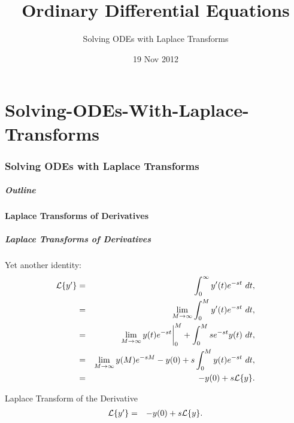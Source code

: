 \part{Solving-ODEs-With-Laplace-Transforms}
\section{Solving ODEs with Laplace Transforms}

\title{Ordinary Differential Equations}
\subtitle{Solving ODEs with Laplace Transforms}
\date{19 Nov 2012}

\begin{frame}
  \titlepage
\end{frame}

\begin{frame}
  \frametitle{Outline}
  \tableofcontents[ currentsection ]
\end{frame}


\subsection{Laplace Transforms of Derivatives}


\begin{frame}
  \frametitle{Laplace Transforms of Derivatives}

  Yet another identity:
  \begin{eqnarray*}
    \laplace{y'} & = & \int^\infty_0 y'(t) e^{-st} ~ dt, \\
    & = & \lim_{M\rightarrow\infty} \int^M_0 y'(t) e^{-st} ~ dt, \\
    & = & \lim_{M\rightarrow\infty} y(t)e^{-st} \bigg|^M_0 + \int^M_0 s e^{-st} y(t)~dt, \\
    & = & \lim_{M\rightarrow\infty} y(M)e^{-sM} - y(0) + s \int^M_0 y(t) e^{-st} ~dt, \\
    & = & -y(0) + s \laplace{y}.
  \end{eqnarray*}

\end{frame}

\begin{frame}
  \begin{block}{Laplace Transform of the Derivative}
    \begin{eqnarray*}
      \laplace{y'} & = & -y(0) + s \laplace{y}.
    \end{eqnarray*}
  \end{block}
\end{frame}

